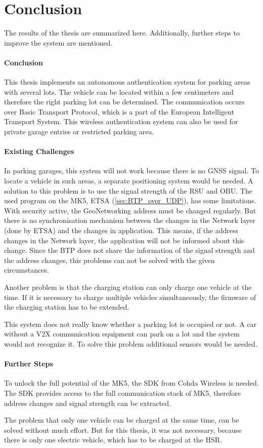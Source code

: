 \chapter{Conclusion}
The results of the thesis are summarized here. Additionally, further steps to improve the system are mentioned. 

\subsubsection{Conclusion}

This thesis implements an autonomous authentication system for parking areas with several lots. The vehicle can be located within a few centimeters and therefore the right parking lot can be determined. The communication occurs over Basic Transport Protocol, which is a part of the European Intelligent Transport System. This wireless authentication system can also be used for private garage entries or restricted parking area.

\subsubsection{Existing Challenges}

In parking garages, this system will not work because there is no GNSS signal. To locate a vehicle in such areas, a separate positioning system would be needed. A solution to this problem is to use the signal strength of the RSU and OBU. The used program on the MK5, ETSA (\ref{sec:BTP_over_UDP}), has some limitations. With security active, the GeoNetworking address must be changed regularly. But there is no synchronisation mechanism between the changes in the Network layer (done by ETSA) and the changes in application. This means, if the address changes in the Network layer, the application will not be informed about this change. Since the BTP does not share the information of the signal strength and the address changes, this problems can not be solved with the given circumstances.

Another problem is that the charging station can only charge one vehicle at the time. If it is necessary to charge multiple vehicles simultaneously, the firmware of the charging station has to be extended.

This system does not really know whether a parking lot is occupied or not. A car without a V2X communication equipment can park on a lot and the system would not recognize it. To solve this problem additional sensors would be needed.

\subsubsection{Further Steps}

To unlock the full potential of the MK5, the SDK from Cohda Wireless is needed. The SDK provides access to the full communication stack of MK5, therefore address changes and signal strength can be extracted.

The problem that only one vehicle can be charged at the same time, can be solved without much effort. But for this thesis, it was not necessary, because there is only one electric vehicle, which has to be charged at the HSR.


\clearpage